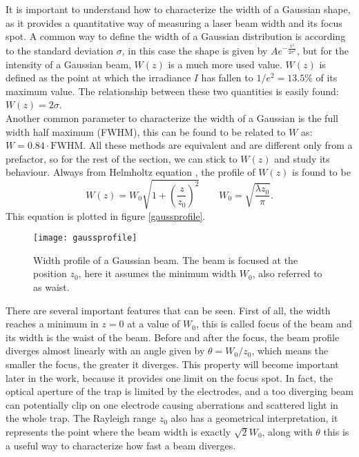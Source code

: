 It is important to understand how to characterize the width of a Gaussian shape, as it provides a quantitative way of measuring a laser beam width and its focus spot. A common way to define the width of a Gaussian distribution is according to the standard deviation $\sigma$, in this case the shape is given by $Ae^{-\frac{x^2}{2\sigma^2}}$, but for the intensity of a Gaussian beam, $W(z)$ is a much more used value. $W(z)$ is defined as the point at which the irradiance $I$ has fallen to $1/e^2 = 13.5\%$ of its maximum value. The relationship between these two quantities is easily found: $W(z) = 2\sigma$.\\
Another common parameter to characterize the width of a Gaussian is the full width half maximum (FWHM), this can be found to be related to $W$ as: $W = 0.84\cdot \text{FWHM}$. All these methods are equivalent and are different only from a prefactor, so for the rest of the section, we can stick to $W(z)$ and study its behaviour. Always from Helmholtz equation \cite{saleh}, the profile of $W(z)$ is found to be
\begin{equation}
\label{waistprofile}
W(z) = W_0 \sqrt{1 + \left(\frac{z}{z_0}\right)^2}\qquad W_0 = \sqrt{\frac{\lambda z_0}{\pi}}.
\end{equation}
This equation is plotted in figure \eqref{gaussprofile}.
\begin{figure}
\centering
\texttt{[image: gaussprofile]}
\caption{Width profile of a Gaussian beam. The beam is focused at the position $z_0$, here it assumes the minimum width $W_0$, also referred to as waist.}
\label{gaussprofile}
\end{figure}
There are several important features that can be seen. First of all, the width reaches a minimum in $z=0$ at a value of $W_0$, this is called focus of the beam and its width is the waist of the beam. Before and after the focus, the beam profile diverges almost linearly with an angle given by $\theta = W_0/z_0$, which means the smaller the focus, the greater it diverges. This property will become important later in the work, because it provides one limit on the focus spot. In fact, the optical aperture of the trap is limited by the electrodes, and a too diverging beam can potentially clip on one electrode causing aberrations and scattered light in the whole trap.  The Rayleigh range $z_0$ also has a geometrical interpretation, it represents the point where the beam width is exactly $\sqrt{2}W_0$, along with $\theta$ this is a useful way to characterize how fast a beam diverges.\\

